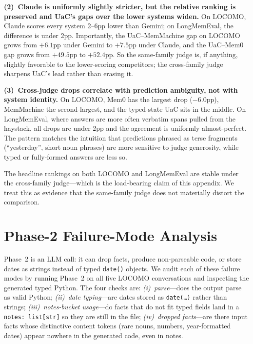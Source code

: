 \textbf{(2)~Claude is uniformly slightly stricter, but the relative ranking is preserved and UaC's gaps over the lower systems widen.} On LOCOMO, Claude scores every system 2--6pp lower than Gemini; on LongMemEval, the difference is under 2pp. Importantly, the UaC--MemMachine gap on LOCOMO grows from $+6.1$pp under Gemini to $+7.5$pp under Claude, and the UaC--Mem0 gap grows from $+49.5$pp to $+52.4$pp. So the same-family judge is, if anything, slightly favorable to the lower-scoring competitors; the cross-family judge sharpens UaC's lead rather than erasing it.

\textbf{(3)~Cross-judge drops correlate with prediction ambiguity, not with system identity.} On LOCOMO, Mem0 has the largest drop ($-6.0$pp), MemMachine the second-largest, and the typed-state UaC sits in the middle. On LongMemEval, where answers are more often verbatim spans pulled from the haystack, all drops are under 2pp and the agreement is uniformly almost-perfect. The pattern matches the intuition that predictions phrased as terse fragments (``yesterday'', short noun phrases) are more sensitive to judge generosity, while typed or fully-formed answers are less so.

The headline rankings on both LOCOMO and LongMemEval are stable under the cross-family judge---which is the load-bearing claim of this appendix. We treat this as evidence that the same-family judge does not materially distort the comparison.


\section{Phase-2 Failure-Mode Analysis}
\label{sec:phase2-failures}

Phase~2 is an LLM call: it can drop facts, produce non-parseable code, or store dates as strings instead of typed \texttt{date()} objects. We audit each of these failure modes by running Phase~2 on all five LOCOMO conversations and inspecting the generated typed Python. The four checks are: \emph{(i)~parse}---does the output parse as valid Python; \emph{(ii)~date typing}---are dates stored as \texttt{date(\dots)} rather than strings; \emph{(iii)~notes-bucket usage}---do facts that do not fit typed fields land in a \texttt{notes: list[str]} so they are still in the file; \emph{(iv)~dropped facts}---are there input facts whose distinctive content tokens (rare nouns, numbers, year-formatted dates) appear nowhere in the generated code, even in notes.

